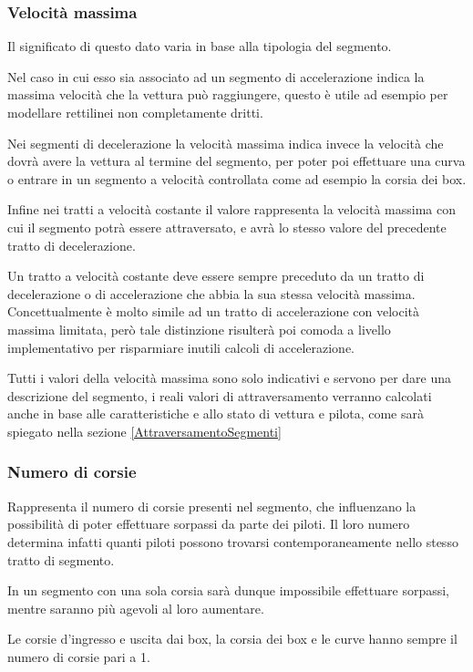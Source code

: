 \documentclass[a4paper,11pt, twoside, openright]{book}
\begin{document}
	\subsubsection{Velocità massima}
	  Il significato di questo dato varia in base alla tipologia del segmento. 
	  
	  Nel caso
	  in cui esso sia associato ad un segmento di accelerazione indica la massima velocità che la vettura può raggiungere,
	  questo è utile ad esempio per modellare rettilinei non completamente dritti.
	  
	  Nei segmenti di decelerazione la velocità massima indica invece la velocità che dovrà avere la vettura al termine del
	  segmento, per poter poi effettuare una curva o entrare in un segmento a velocità controllata come ad esempio la
	  corsia dei box.
	  
	  Infine nei tratti a velocità costante il valore rappresenta la velocità massima con cui il segmento potrà essere
	  attraversato, e avrà lo stesso valore del precedente tratto di decelerazione.
	  
	  Un tratto a velocità costante deve essere sempre preceduto da un tratto di decelerazione o di accelerazione
	  che abbia la sua stessa velocità massima. Concettualmente è molto simile ad un tratto di accelerazione
	  con velocità massima limitata, però tale distinzione risulterà poi comoda a livello implementativo
	  per risparmiare inutili calcoli di accelerazione.
	  
	  Tutti i valori della velocità massima sono solo indicativi e servono per dare una descrizione del segmento,
	  i reali valori di attraversamento verranno calcolati anche in base alle caratteristiche e allo stato di 
	  vettura e pilota, come sarà spiegato nella sezione \ref{AttraversamentoSegmenti}
	    
	\subsubsection{Numero di corsie}
	  Rappresenta il numero di corsie presenti nel segmento, che influenzano la possibilità
	  di poter effettuare sorpassi da parte dei piloti. Il loro numero determina infatti quanti piloti possono trovarsi
	  contemporaneamente nello stesso tratto di segmento.
	  
	  In un segmento con una sola corsia sarà dunque impossibile effettuare sorpassi, mentre saranno più agevoli
	  al loro aumentare.
	  
	  Le corsie d'ingresso e uscita dai box, la corsia dei box e le curve hanno sempre il numero di corsie pari
	  a 1.
	  
\end{document}
